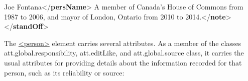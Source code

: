 \begin{shaded}
\hspace*{1em}\mbox{}\newline 
\hspace*{1em}\mbox{}\newline 
\hspace*{1em}\hspace*{1em}Joe Fontana{</\textbf{persName}>}\mbox{}\newline 
\hspace*{1em}\hspace*{1em}A member of Canada’s House of Commons from 1987 to 2006,\mbox{}\newline 
\hspace*{1em}\hspace*{1em}\hspace*{1em}\hspace*{1em}\hspace*{1em}\hspace*{1em} and mayor of London, Ontario from 2010 to 2014.{</\textbf{note}>}\mbox{}\newline 
\hspace*{1em}\mbox{}\newline 
{}\mbox{}\newline 
{</\textbf{standOff}>}\end{shaded}\egroup\par \par
The \hyperref[TEI.person]{<person>} element carries several attributes. As a member of the classes \textsf{att.global.responsibility}, \textsf{att.editLike}, and \textsf{att.global.source} class, it carries the usual attributes for providing details about the information recorded for that person, such as its reliability or source: 
